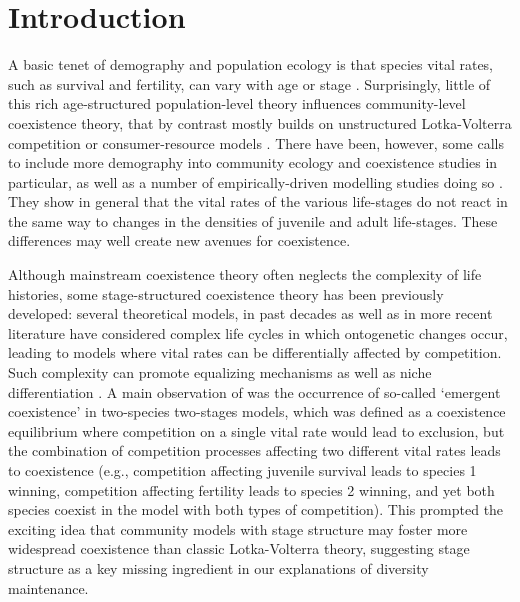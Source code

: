 \documentclass{article}
\begin{document}
\section{Introduction}
A basic tenet of demography and population ecology is that species vital rates, such as survival and fertility, can vary with age or stage \citep{leslie1945use, cushing1998introduction, caswell2001matrix}. Surprisingly, little of this rich age-structured population-level theory influences community-level coexistence theory, that by contrast mostly builds on unstructured Lotka-Volterra competition or consumer-resource  models \citep{chesson2000mechanisms,barabas2016effect,letten2017linking}. There have been, however, some calls to include more demography into community ecology \citep[e.g.,][]{miller2011thinking} and coexistence studies in particular, as well as a number of empirically-driven modelling studies doing so \citep{peron2012integrated,chu2015large}. They show in general that the vital rates of the various life-stages do not react in the same way to changes in the densities of juvenile and adult life-stages. These differences may well create new avenues for coexistence.  

Although mainstream coexistence theory often neglects the complexity of life histories, some stage-structured coexistence theory has been previously developed: several theoretical models, in past decades \citep{haigh1972can,loreau1994competitive} as well as in more recent literature \citep{moll2008competition, fujiwara2011coexistence} have considered complex life cycles in which ontogenetic changes occur, leading to models where vital rates can be differentially affected by competition. Such complexity can promote equalizing mechanisms \citep{fujiwara2011coexistence} as well as niche differentiation \citep{moll2008competition}. 
A main observation of \citet{moll2008competition} was the occurrence of so-called `emergent coexistence' in two-species two-stages models, which was defined as a coexistence equilibrium where competition on a single vital rate would lead to exclusion, but the combination of competition processes affecting two different vital rates leads to coexistence (e.g., competition affecting juvenile survival leads to species 1 winning, competition affecting fertility leads to species 2 winning, and yet both species coexist in the model with both types of competition). This prompted the exciting idea that community models with stage structure may foster more widespread coexistence than classic Lotka-Volterra theory, suggesting stage structure as a key missing ingredient in our explanations of diversity maintenance. 
\end{document}
